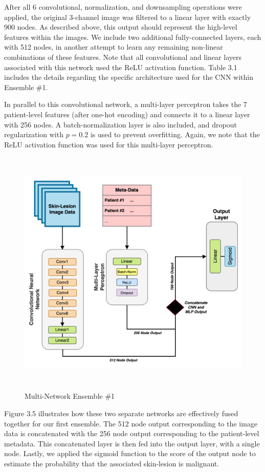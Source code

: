 \documentclass [MAS] {uclathes}
\begin{document}
After all 6 convolutional, normalization, and downsampling operations were applied, the original 3-channel image was filtered to a linear layer with exactly 900 nodes. As described above, this output should represent the high-level features within the images. We include two additional fully-connected layers, each with 512 nodes, in another attempt to learn any remaining non-linear combinations of these features. Note that all convolutional and linear layers associated with this network used the ReLU activation function. Table 3.1 includes the details regarding the specific architecture used for the CNN within Ensemble \#1.

In parallel to this convolutional network, a multi-layer perceptron takes the 7 patient-level features (after one-hot encoding) and connects it to a linear layer with 256 nodes. A batch-normalization layer is also included, and dropout regularization with $p=0.2$ is used to prevent overfitting. Again, we note that the ReLU activation function was used for this multi-layer perceptron. 

\begin{figure}[h]
\centering
\includegraphics[height = 120mm, width= 140mm]{imgs/ens1_arch.png}
\caption{Multi-Network Ensemble \#1}
\label{fig:ens1_arch}
\end{figure}

Figure 3.5 illustrates how these two separate networks are effectively fused together for our first ensemble. The 512 node output corresponding to the image data is concatenated with the 256 node output corresponding to the patient-level metadata. This concatenated layer is then fed into the output layer, with a single node. Lastly, we applied the sigmoid function to the score of the output node to estimate the probability that the associated skin-lesion is malignant. 
\end{document}
